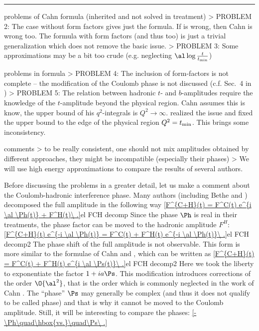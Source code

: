 

\hrule

\iffalse
\> problems of Cahn formula (inherited and not solved in \KL{} treatment)
\>> PROBLEM 2: The case without form factors gives just the \WY{} formula. If \WY{} is wrong, then Cahn is wrong too. The formula with form factors (and thus \KL too) is just a trivial generalization which does not remove the basic issue.
\>> PROBLEM 3: Some approximations may be a bit too crude (e.g. neglecting $\al \log {t\over t_{\rm min}}$)

\> problems in \KL{} formula
\>> PROBLEM 4: The inclusion of form-factors is not complete -- the modification of the Coulomb phase is not discussed (c.f. Sec.~4 in )
\>> PROBLEM 5: The relation between hadronic $t$- and $b$-amplitudes require the knowledge of the $t$-amplitude beyond the physical region. Cahn assumes this is know, the upper bound of his $q^2$-integrals is $Q^2\to\infty$. \KL{} realized the issue and fixed the upper bound to the edge of the physical region $Q^2 = t_{\rm min}$. This brings some inconsistency.

\> comments
\>> to be really consistent, one should not mix amplitudes obtained by different approaches, they might be incompatible (especially their phases) 
\>> We will use high energy approximations to compare the results of several authors.

\vskip1cm


Before discussing the problems in a greater detail, let us make a comment about the Coulomb-hadronic interference phase. Many authors (including Bethe  and \WY{} ) decomposed the full amplitude in the following way
\eqref{F^{C+H}(t) = F^C(t) e^{i \al \Ph(t)} + F^H(t)\ .}{el FCH decomp}
Since the phase $\Ph$ is real in their treatments, the phase factor can be moved to the hadronic amplitude $F^H$:
\eqref{F^{C+H}(t) e^{-i \al \Ph(t)} = F^C(t) + F^H(t) e^{-i \al \Ph(t)}\ .}{el FCH decomp2}
The phase shift of the full amplitude is not observable. This form is more similar to the formulae of Cahn  and \KL{} , which can be written as
\eqref{F^{C+H}(t) = F^C(t) + F^H(t) e^{i \al \Ps(t)}\ .}{el FCH decomp2}
Here we took the liberty to exponentiate the factor $1+ia\Ps$. This modification introduces corrections of the order $\O{\al^2}$, that is the order which is commonly neglected in the work of Cahn . The ``phase'' $\Ps$ may generally be complex (and thus it does not qualify to be called phase) and that is why it cannot be moved to the Coulomb amplitude. Still, it will be interesting to compare the phases:
\eqref{-\Ph\quad\hbox{vs.}\quad\Ps\ .}{}


